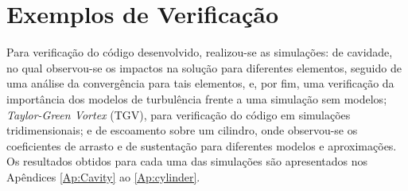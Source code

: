 \section{Exemplos de Verificação} \label{ExemplosMT}

Para verificação do código desenvolvido, realizou-se as simulações: de cavidade, no qual observou-se os impactos na solução para diferentes elementos, seguido de uma análise da convergência para tais elementos, e, por fim, uma verificação da importância dos modelos de turbulência frente a uma simulação sem modelos; \textit{Taylor-Green Vortex} (TGV), para verificação do código em simulações tridimensionais; e de escoamento sobre um cilindro, onde observou-se os coeficientes de arrasto e de sustentação para diferentes modelos e aproximações. Os resultados obtidos para cada uma das simulações são apresentados nos Apêndices \ref{Ap:Cavity} ao \ref{Ap:cylinder}.
